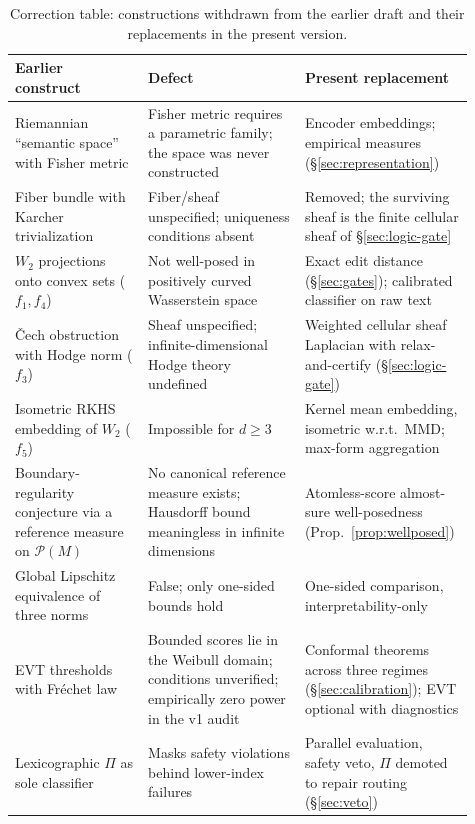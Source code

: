 \begin{table}[h]
\centering
\small
\begin{tabular}{p{0.28\linewidth}p{0.33\linewidth}p{0.30\linewidth}}
\toprule
\textbf{Earlier construct} & \textbf{Defect} & \textbf{Present replacement}\\
\midrule
Riemannian ``semantic space'' with Fisher metric &
Fisher metric requires a parametric family; the space was never constructed &
Encoder embeddings; empirical measures (\S\ref{sec:representation})\\
\addlinespace
Fiber bundle with Karcher trivialization &
Fiber/sheaf unspecified; uniqueness conditions absent &
Removed; the surviving sheaf is the finite cellular sheaf of
\S\ref{sec:logic-gate}\\
\addlinespace
$W_2$ projections onto convex sets ($f_1,f_4$) &
Not well-posed in positively curved Wasserstein space &
Exact edit distance (\S\ref{sec:gates}); calibrated classifier on raw text\\
\addlinespace
\v{C}ech obstruction with Hodge norm ($f_3$) &
Sheaf unspecified; infinite-dimensional Hodge theory undefined &
Weighted cellular sheaf Laplacian with relax-and-certify
(\S\ref{sec:logic-gate})\\
\addlinespace
Isometric RKHS embedding of $W_2$ ($f_5$) &
Impossible for $d\ge 3$ \cite{andoni2018} &
Kernel mean embedding, isometric w.r.t.\ MMD; max-form aggregation\\
\addlinespace
Boundary-regularity conjecture via a reference measure on $\mathcal P(M)$ &
No canonical reference measure exists; Hausdorff bound meaningless in
infinite dimensions &
Atomless-score almost-sure well-posedness (Prop.~\ref{prop:wellposed})\\
\addlinespace
Global Lipschitz equivalence of three norms &
False; only one-sided bounds hold &
One-sided comparison, interpretability-only\\
\addlinespace
EVT thresholds with Fr\'echet law &
Bounded scores lie in the Weibull domain; conditions unverified; empirically
zero power in the v1 audit &
Conformal theorems across three regimes (\S\ref{sec:calibration}); EVT
optional with diagnostics\\
\addlinespace
Lexicographic $\Pi$ as sole classifier &
Masks safety violations behind lower-index failures &
Parallel evaluation, safety veto, $\Pi$ demoted to repair routing
(\S\ref{sec:veto})\\
\bottomrule
\end{tabular}
\caption{Correction table: constructions withdrawn from the earlier draft and
their replacements in the present version.}
\end{table}
